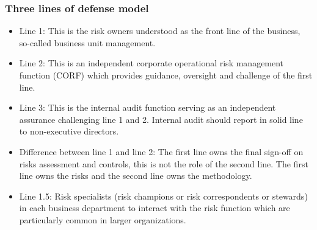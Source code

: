 \subsubsection{Three lines of defense model}
\begin{itemize}
\item Line 1: This is the risk owners understood as the front line of the business, so-called business unit management.
\item  Line 2: This is an independent corporate operational risk management function (CORF) which provides guidance, oversight and challenge of the first line.
\item  Line 3: This is the internal audit function serving as an independent assurance challenging line 1 and 2. Internal audit should report in solid line to non-executive directors.
\item Difference between line 1 and line 2: The first line owns the final sign-off on risks assessment and controls, this is not the role of the second line. The first line owns the risks and the second line owns the methodology.
\item  Line 1.5: Risk specialists (risk champions or risk correspondents or stewards) in each business department to interact with the risk function which are particularly common in larger organizations.
\end{itemize}


